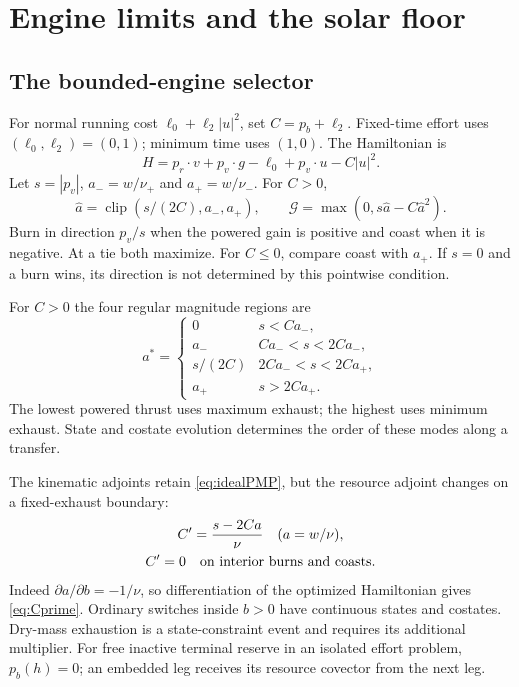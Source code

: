 \section{Engine limits and the solar floor}
\label{sec:constraints}
\subsection{The bounded-engine selector}
For normal running cost $\ell_0+\ell_2|u|^2$, set
$C=p_b+\ell_2$. Fixed-time effort uses $(\ell_0,\ell_2)=(0,1)$;
minimum time uses $(1,0)$. The Hamiltonian is
\begin{equation}
 H=p_r\cdot v+p_v\cdot g-\ell_0+p_v\cdot u-C|u|^2.
\end{equation}
Let $s=|p_v|$, $a_-=w/\nu_+$ and $a_+=w/\nu_-$. For $C>0$,
\begin{equation}
 \widehat a=\operatorname{clip}(s/(2C),a_-,a_+),\qquad
 \mathcal G=\max(0,s\widehat a-C\widehat a^2).
 \label{eq:selector}
\end{equation}
Burn in direction $p_v/s$ when the powered gain is positive and coast
when it is negative. At a tie both maximize. For $C\le0$, compare
coast with $a_+$. If $s=0$ and a burn wins, its direction is not
determined by this pointwise condition.

For $C>0$ the four regular magnitude regions are
\begin{equation}
 a^*=\begin{cases}
 0&s<Ca_-,\\
 a_-&Ca_-<s<2Ca_-,\\
 s/(2C)&2Ca_-<s<2Ca_+,\\
 a_+&s>2Ca_+.
 \end{cases}
\end{equation}
The lowest powered thrust uses maximum exhaust; the highest uses
minimum exhaust. State and costate evolution determines the order of
these modes along a transfer.

The kinematic adjoints retain \eqref{eq:idealPMP}, but the resource
adjoint changes on a fixed-exhaust boundary:
\begin{equation}
 \begin{gathered}
 C'=\frac{s-2Ca}{\nu}\quad(a=w/\nu),\\
 C'=0\quad\hbox{on interior burns and coasts}.
 \end{gathered}
 \label{eq:Cprime}
\end{equation}
Indeed $\partial a/\partial b=-1/\nu$, so differentiation of the
optimized Hamiltonian gives \eqref{eq:Cprime}. Ordinary switches
inside $b>0$ have continuous states and costates. Dry-mass exhaustion
is a state-constraint event and requires its additional multiplier.
For free inactive terminal reserve in an isolated effort problem,
$p_b(h)=0$; an embedded leg receives its resource covector from the
next leg.

